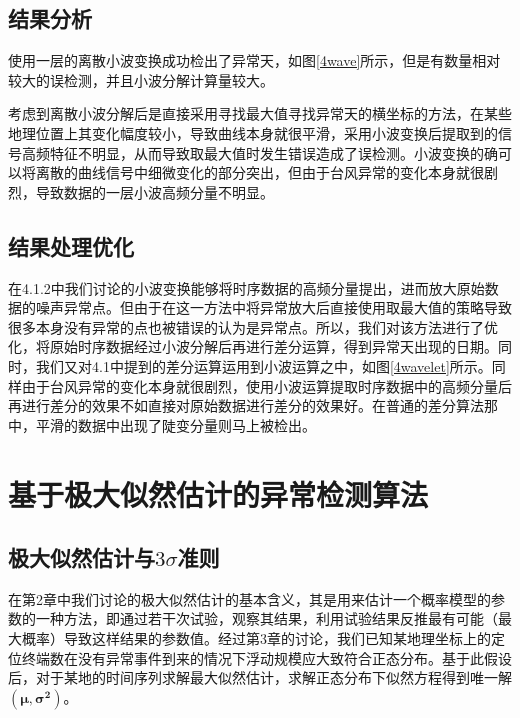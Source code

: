 \documentclass[a4paper,AutoFakeBold,oneside,12pt]{book}
\begin{document}
\subsection{结果分析}
	使用一层的离散小波变换成功检出了异常天，如图\ref{4wave}所示，但是有数量相对较大的误检测，并且小波分解计算量较大。


	考虑到离散小波分解后是直接采用寻找最大值寻找异常天的横坐标的方法，在某些地理位置上其变化幅度较小，导致曲线本身就很平滑，采用小波变换后提取到的信号高频特征不明显，从而导致取最大值时发生错误造成了误检测。小波变换的确可以将离散的曲线信号中细微变化的部分突出，但由于台风异常的变化本身就很剧烈，导致数据的一层小波高频分量不明显。

\subsection{结果处理优化}
	在4.1.2中我们讨论的小波变换能够将时序数据的高频分量提出，进而放大原始数据的噪声异常点。但由于在这一方法中将异常放大后直接使用取最大值的策略导致很多本身没有异常的点也被错误的认为是异常点。所以，我们对该方法进行了优化，将原始时序数据经过小波分解后再进行差分运算，得到异常天出现的日期。同时，我们又对4.1中提到的差分运算运用到小波运算之中，如图\ref{4wavelet}所示。同样由于台风异常的变化本身就很剧烈，使用小波运算提取时序数据中的高频分量后再进行差分的效果不如直接对原始数据进行差分的效果好。在普通的差分算法那中，平滑的数据中出现了陡变分量则马上被检出。


\section{基于极大似然估计的异常检测算法}
\subsection{极大似然估计与$3\sigma$准则}
	在第2章中我们讨论的极大似然估计的基本含义，其是用来估计一个概率模型的参数的一种方法，即通过若干次试验，观察其结果，利用试验结果反推最有可能（最大概率）导致这样结果的参数值。经过第3章的讨论，我们已知某地理坐标上的定位终端数在没有异常事件到来的情况下浮动规模应大致符合正态分布。基于此假设后，对于某地的时间序列求解最大似然估计，求解正态分布下似然方程得到唯一解$\bm{(\mu,\sigma^2)}$。
\end{document}
